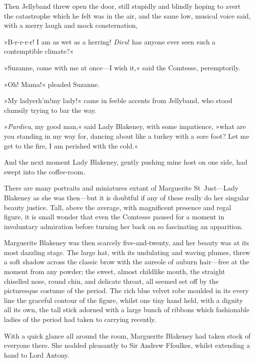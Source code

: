Then Jellyband threw open the door, still stupidly and blindly hoping to avert the catastrophe which he felt was in the air, and the same low, musical voice said, with a merry laugh and mock consternation,\longdash


»B-r-r-r-r! I am as wet as a herring! \textit{Dieu}! has anyone ever seen such a contemptible climate?«

»Suzanne, come with me at once—I wish it,« said the Comtesse, peremptorily.

»Oh! Mama!« pleaded Suzanne.

»My lady\textellipsis \allowbreak  er\textellipsis \allowbreak  h'm!\textellipsis \allowbreak  my lady!\textellipsis« came in feeble accents from Jellyband, who stood clumsily trying to bar the way.

»\textit{Pardieu}, my good man,« said Lady Blakeney, with some impatience, »what are you standing in my way for, dancing about like a turkey with a sore foot? Let me get to the fire, I am perished with the cold.«

And the next moment Lady Blakeney, gently pushing mine host on one side, had swept into the coffee-room.

There are many portraits and miniatures extant of Marguerite St~Just—Lady Blakeney as she was then—but it is doubtful if any of these really do her singular beauty justice. Tall, above the average, with magnificent presence and regal figure, it is small wonder that even the Comtesse paused for a moment in involuntary admiration before turning her back on so fascinating an apparition.

Marguerite Blakeney was then scarcely five-and-twenty, and her beauty was at its most dazzling stage. The large hat, with its undulating and waving plumes, threw a soft shadow across the classic brow with the aureole of auburn hair—free at the moment from any powder; the sweet, almost childlike mouth, the straight chiselled nose, round chin, and delicate throat, all seemed set off by the picturesque costume of the period. The rich blue velvet robe moulded in its every line the graceful contour of the figure, whilst one tiny hand held, with a dignity all its own, the tall stick adorned with a large bunch of ribbons which fashionable ladies of the period had taken to carrying recently.

With a quick glance all around the room, Marguerite Blakeney had taken stock of everyone there. She nodded pleasantly to Sir Andrew Ffoulkes, whilst extending a hand to Lord Antony.

